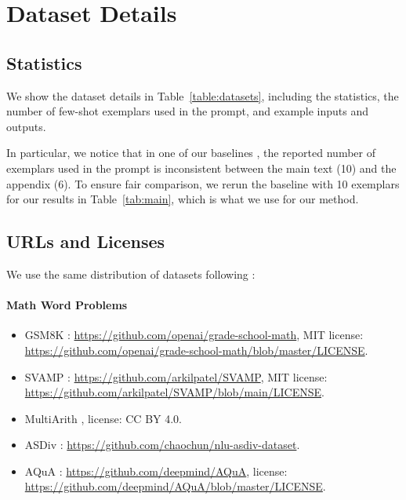 \documentclass[11pt]{article}
\begin{document}
\section{Dataset Details}
\label{sec:appendix_dataset_details}

\subsection{Statistics}

We show the dataset details in Table~\ref{table:datasets}, including the statistics, the number of few-shot exemplars used in the prompt, and example inputs and outputs.

In particular, we notice that in one of our baselines \citet{wei_chain_2022}, the reported number of exemplars used in the prompt is inconsistent between the main text (10) and the appendix (6). To ensure fair comparison, we rerun the baseline with 10 exemplars for our results in Table~\ref{tab:main}, which is what we use for our method. 



\subsection{URLs and Licenses}

We use the same distribution of datasets following \citet{wei_chain_2022}:

\paragraph{Math Word Problems}
\begin{itemize}
    \item GSM8K \citep{cobbe_training_2021}: \url{https://github.com/openai/grade-school-math}, MIT license: \url{https://github.com/openai/grade-school-math/blob/master/LICENSE}.
    \item SVAMP \citep{patel_are_2021}: \url{https://github.com/arkilpatel/SVAMP}, MIT license: \url{https://github.com/arkilpatel/SVAMP/blob/main/LICENSE}.
    \item MultiArith \citep{roy_solving_2015}, license: CC BY 4.0.
    \item ASDiv \citep{miao_diverse_2020}: \url{https://github.com/chaochun/nlu-asdiv-dataset}.
    \item AQuA \citep{ling_program_2017}: \url{https://github.com/deepmind/AQuA}, license: \url{https://github.com/deepmind/AQuA/blob/master/LICENSE}.
\end{itemize}
\end{document}
